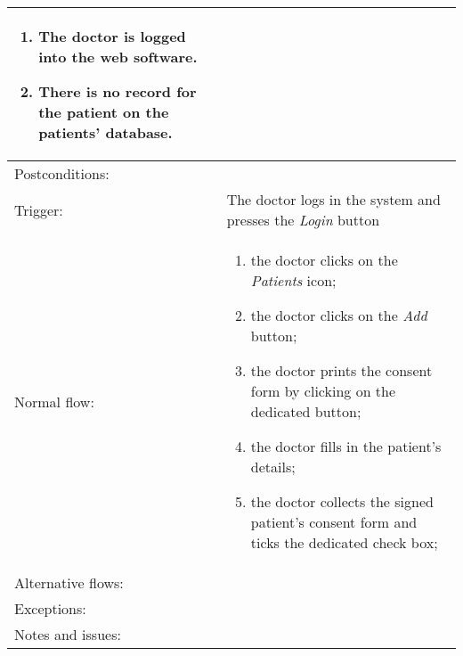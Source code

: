 \begin{longtable}{| p{3.5cm} | p{9cm} |}
\begin{enumerate}
\item The doctor is logged into the web software.
\item There is no record for the patient on the patients' database.
\end{enumerate}\\
\hline
Postconditions: & \\
\hline
Trigger: & The doctor logs in the system and presses the \textit{Login} button\\
\hline
Normal flow: &\mbox{}\par\vspace{-\baselineskip}
\begin{enumerate}
\item the doctor clicks on the \textit{Patients} icon;
\item the doctor clicks on the \textit{Add} button;
\item the doctor prints the consent form by clicking on the dedicated button;
\item the doctor fills in the patient's details;
\item the doctor collects the signed patient's consent form and ticks the dedicated check box;
\end{enumerate}\\
\hline
Alternative flows: & \\
\hline
Exceptions: & \\
\hline
Notes and issues: &\\
\hline
\end{longtable}
